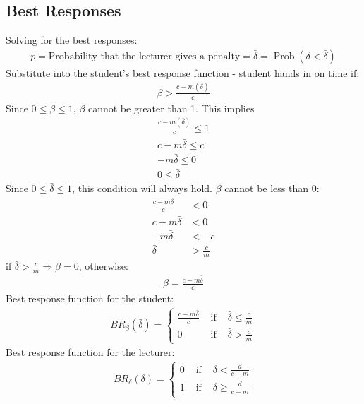 \documentclass[11pt,preprint, authoryear]{elsarticle}
\numberwithin{equation}{section}
\numberwithin{figure}{section}
\numberwithin{table}{section}
\begin{document}
\hypertarget{best-responses}{%
\subsection*{\texorpdfstring{Best Responses
\label{br}}{Best Responses }}\label{best-responses}}

Solving for the best responses: \begin{align*}
p=\text{Probability that the lecturer gives a penalty} = \bar{\delta}=\operatorname{Prob}(\delta<\bar{\delta})
\end{align*} Substitute into the student's best response function -
student hands in on time if: \begin{align*}{}
\beta>\frac{c-m(\bar{\delta})}{c}
\end{align*}{} Since \(0 \leq \beta \leq 1\), \(\beta\) cannot be
greater than 1. This implies \begin{align*}{}
\frac{c-m(\bar{\delta})}{c} \leq 1 \\
c-m \bar{\delta} \leq c \\
-m \bar{\delta} \leq 0 \\
0 \leq \bar{\delta}
\end{align*}{} Since \(0 \leq \bar{\delta} \leq 1\), this condition will
always hold. \(\beta\) cannot be less than 0: \begin{align*}
\frac{c-m \bar{\delta}}{c}&<0 \\
c-m \bar{\delta}&<0 \\
-m \bar{\delta}&< -c \\
\bar{\delta}&>\frac{c}{m}
\end{align*} if \(\bar{\delta}>\frac{c}{m} \Rightarrow \beta=0\),
otherwise: \begin{align*}
\beta =\frac{c-m \bar{\delta}}{c}
\end{align*} Best response function for the student: \begin{align*}
B R_{\beta}(\bar{\delta})=\left\{\begin{array}{lll}
\frac{c-m\bar{\delta}}{c} & \text { if } & \bar{\delta}\leq \frac{c}{m} \\
0 & \text { if } & \bar{\delta}> \frac{c}{m}
\end{array}\right.
\end{align*} Best response function for the lecturer: \begin{align*}
B R_{\delta}(\delta)=\left\{\begin{array}{lll}
0 & \text { if } & \delta<\frac{d}{c+m} \\
1 & \text { if } & \delta \geq \frac{d}{c+m}
\end{array}\right.
\end{align*}
\end{document}

